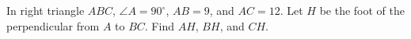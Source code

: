 In right triangle $ABC$, $\angle A=90^\circ$, $AB=9$, and $AC=12$. Let $H$ be the foot of the perpendicular from $A$ to $BC$. Find $AH$, $BH$, and $CH$.
